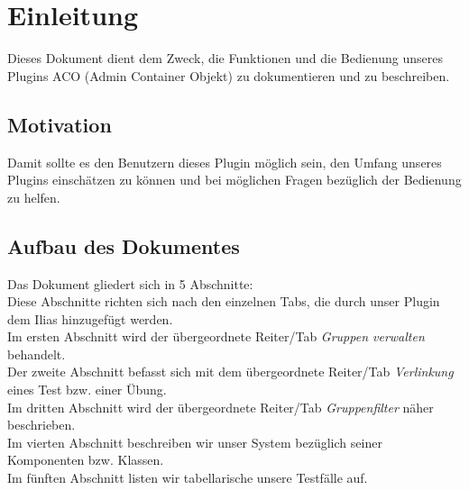 \chapter{Einleitung}
Dieses Dokument dient dem Zweck, die Funktionen und die Bedienung unseres Plugins ACO (Admin Container Objekt) zu dokumentieren und zu beschreiben.  

\section*{Motivation}
Damit sollte es den Benutzern dieses Plugin möglich sein, den Umfang unseres Plugins einschätzen zu können und bei möglichen Fragen bezüglich der Bedienung zu helfen.  

\section*{Aufbau des Dokumentes}
Das Dokument gliedert sich in 5 Abschnitte:\\
Diese Abschnitte richten sich nach den einzelnen Tabs, die durch unser Plugin dem Ilias hinzugefügt werden.\\
Im ersten Abschnitt wird der übergeordnete Reiter/Tab \textit{Gruppen verwalten} behandelt.\\
Der zweite Abschnitt befasst sich mit dem übergeordnete Reiter/Tab \textit{Verlinkung} eines Test bzw. einer Übung.\\
Im dritten Abschnitt wird der übergeordnete Reiter/Tab \textit{Gruppenfilter} näher beschrieben.\\
Im vierten Abschnitt beschreiben wir unser System bezüglich seiner Komponenten bzw. Klassen. \\
Im fünften Abschnitt listen wir tabellarische unsere Testfälle auf. 
 